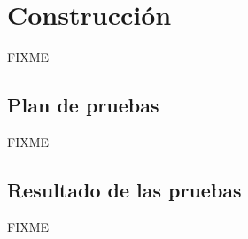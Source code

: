 
\section{Construcción}

FIXME

\subsection{Plan de pruebas}

FIXME

\subsection{Resultado de las pruebas}

FIXME
